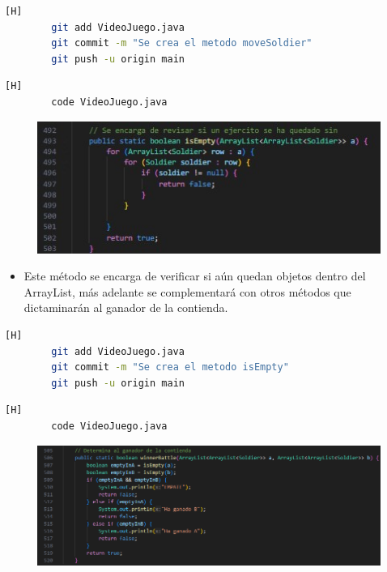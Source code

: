 \documentclass{article}
\begin{document}
	\begin{lstlisting}[language=bash,caption={Commit: aa83f83f4aac63d6a92bb824f0dab2411cbb886f}][H]
		git add VideoJuego.java
		git commit -m "Se crea el metodo moveSoldier"			
		git push -u origin main
	\end{lstlisting}
	
	
	\begin{lstlisting}[language=bash,caption={Se implementa el método que verifica si queda algún objeto dentro de un ArrayList }][H]
		code VideoJuego.java
	\end{lstlisting}
	
	\begin{figure}[H]
		\centering
		\includegraphics[width=1\textwidth,keepaspectratio]{img/isEmpty.jpg}
	\end{figure}
	
	
	\begin{itemize}	
		\item Este método se encarga de verificar si aún quedan objetos dentro del ArrayList, más adelante se complementará con otros métodos que dictaminarán al ganador de la contienda.
	\end{itemize}
	
	\begin{lstlisting}[language=bash,caption={Commit: ab3d57e656981530cd4e74610edf81c1cc600f95}][H]
		git add VideoJuego.java
		git commit -m "Se crea el metodo isEmpty"			
		git push -u origin main
	\end{lstlisting}
	
	
	
	\begin{lstlisting}[language=bash,caption={Se implementa el método que determina al ganador }][H]
		code VideoJuego.java
	\end{lstlisting}
	
	\begin{figure}[H]
		\centering
		\includegraphics[width=1\textwidth,keepaspectratio]{img/winnerBattle.png}
	\end{figure}
	
\end{document}
